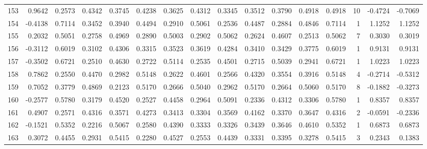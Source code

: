 \begin{tabular}{lrrrrrrrrrrrrrrr}
153 &      0.9642 &  0.2573 &  0.4342 &  0.3745 &  0.4238 &  0.3625 &  0.4312 &  0.3345 &  0.3512 &  0.3790 &   0.4918 &     0.4918 &     10 &                   -0.4724 &                    -0.7069 \\
154 &     -0.4138 &  0.7114 &  0.3452 &  0.3940 &  0.4494 &  0.2910 &  0.5061 &  0.2536 &  0.4487 &  0.2884 &   0.4846 &     0.7114 &      1 &                    1.1252 &                     1.1252 \\
155 &      0.2032 &  0.5051 &  0.2758 &  0.4969 &  0.2890 &  0.5003 &  0.2902 &  0.5062 &  0.2624 &  0.4607 &   0.2513 &     0.5062 &      7 &                    0.3030 &                     0.3019 \\
156 &     -0.3112 &  0.6019 &  0.3102 &  0.4306 &  0.3315 &  0.3523 &  0.3619 &  0.4284 &  0.3410 &  0.3429 &   0.3775 &     0.6019 &      1 &                    0.9131 &                     0.9131 \\
157 &     -0.3502 &  0.6721 &  0.2510 &  0.4630 &  0.2722 &  0.5114 &  0.2535 &  0.4501 &  0.2715 &  0.5039 &   0.2941 &     0.6721 &      1 &                    1.0223 &                     1.0223 \\
158 &      0.7862 &  0.2550 &  0.4470 &  0.2982 &  0.5148 &  0.2622 &  0.4601 &  0.2566 &  0.4320 &  0.3554 &   0.3916 &     0.5148 &      4 &                   -0.2714 &                    -0.5312 \\
159 &      0.7052 &  0.3779 &  0.4869 &  0.2123 &  0.5170 &  0.2666 &  0.5040 &  0.2962 &  0.5170 &  0.2664 &   0.5060 &     0.5170 &      8 &                   -0.1882 &                    -0.3273 \\
160 &     -0.2577 &  0.5780 &  0.3179 &  0.4520 &  0.2527 &  0.4458 &  0.2964 &  0.5091 &  0.2336 &  0.4312 &   0.3306 &     0.5780 &      1 &                    0.8357 &                     0.8357 \\
161 &      0.4907 &  0.2571 &  0.4316 &  0.3571 &  0.4273 &  0.3413 &  0.3304 &  0.3569 &  0.4162 &  0.3370 &   0.3647 &     0.4316 &      2 &                   -0.0591 &                    -0.2336 \\
162 &     -0.1521 &  0.5352 &  0.2216 &  0.5067 &  0.2580 &  0.4390 &  0.3333 &  0.3326 &  0.3439 &  0.3646 &   0.4610 &     0.5352 &      1 &                    0.6873 &                     0.6873 \\
163 &      0.3072 &  0.4455 &  0.2931 &  0.5415 &  0.2280 &  0.4527 &  0.2553 &  0.4439 &  0.3331 &  0.3395 &   0.3278 &     0.5415 &      3 &                    0.2343 &                     0.1383 \\

\end{tabular}
